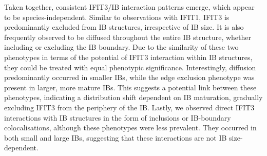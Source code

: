 Taken together, consistent IFIT3/IB interaction patterns emerge, which appear to be species-independent. Similar to observations with IFIT1, IFIT3 is predominantly excluded from IB structures, irrespective of IB size. It is also frequently observed to be diffused throughout the entire IB structure, whether including or excluding the IB boundary. Due to the similarity of these two phenotypes in terms of the potential of IFIT3 interaction within IB structures, they could be treated with equal phenotypic significance. Interestingly, diffusion predominantly occurred in smaller IBs, while the edge exclusion phenotype was present in larger, more mature IBs. This suggests a potential link between these phenotypes, indicating a distribution shift dependent on IB maturation, gradually excluding IFIT3 from the periphery of the IB. Lastly, we observed direct IFIT3 interactions with IB structures in the form of inclusions or IB-boundary colocalisations, although these phenotypes were less prevalent. They occurred in both small and large IBs, suggesting that these interactions are not IB size-dependent.


